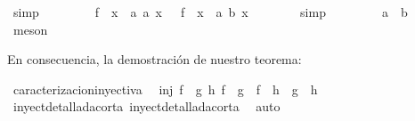 \begin{isabellebody}
\ simp\isanewline
\ \ \ \ \isamarkupfalse%
\ \isamarkupfalse%
\ {\isachardoublequoteopen}\ {\isacharparenleft}f\ {\isasymcirc}\ {\isacharparenleft}{\isasymlambda}x\ {\isacharcolon}{\isacharcolon}\ {\isacharprime}a{\isachardot}\ a{\isacharparenright}{\isacharparenright}\ x\ {\isacharequal}\ \ {\isacharparenleft}f\ {\isasymcirc}\ {\isacharparenleft}{\isasymlambda}x\ {\isacharcolon}{\isacharcolon}\ {\isacharprime}a{\isachardot}\ b{\isacharparenright}{\isacharparenright}\ x{\isachardoublequoteclose}\isanewline
\ \ \ \ \ \ \isamarkupfalse%
\ simp\isanewline
\ \ \isamarkupfalse%
\isanewline
\ \ \isamarkupfalse%
\ \ {\isachardoublequoteopen}\ a\ {\isacharequal}\ b{\isachardoublequoteclose}\ \isamarkupfalse%
\ {}\ {}\ \isamarkupfalse%
\ meson\isanewline
{}\isamarkupfalse%
%
\endisatagproof
{\isafoldproof}%
%
\isadelimproof
%
\endisadelimproof
%
\begin{isamarkuptext}%
En consecuencia, la demostración de nuestro teorema:%
\end{isamarkuptext}\isamarkuptrue%
\isamarkupfalse%
\ caracterizacioninyectiva{\isacharcolon}\isanewline
\ \ {\isachardoublequoteopen}inj\ f\ {\isasymlongleftrightarrow}\ {\isacharparenleft}{\isasymforall}g\ h{\isachardot}\ {\isacharparenleft}f\ {\isasymcirc}\ g\ {\isacharequal}\ f\ {\isasymcirc}\ h{\isacharparenright}\ {\isasymlongrightarrow}\ {\isacharparenleft}g\ {\isacharequal}\ h{\isacharparenright}{\isacharparenright}{\isachardoublequoteclose}\isanewline
%
\isadelimproof
\ \ %
\endisadelimproof
%
\isatagproof
{}\isamarkupfalse%
\ inyectdetalladacorta{}\ inyectdetalladacorta{}\ \isamarkupfalse%
\ auto\isanewline
\isanewline
\isanewline
\isanewline
\isanewline
%
\endisatagproof
{\isafoldproof}%
%
\isadelimproof
%
\endisadelimproof
%
\isadelimtheory
%
\endisadelimtheory
%
\isatagtheory
%
\endisatagtheory
{\isafoldtheory}%
%
\isadelimtheory
%
\endisadelimtheory
%
\end{isabellebody}%
\endinput
